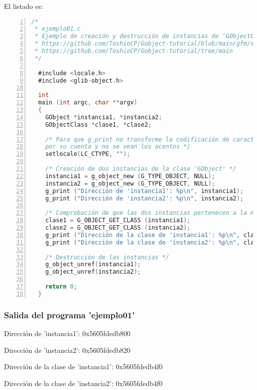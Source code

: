 El listado es:
\begin{lstlisting}[language=C, numbers=left]
/*
 * ejemplo01.c
 * Ejemplo de creación y destrucción de instancias de 'GObjectClass'.
 * https://github.com/ToshioCP/Gobject-tutorial/blob/main/gfm/sec2.md
 * https://github.com/ToshioCP/Gobject-tutorial/tree/main
 */

  #include <locale.h>
  #include <glib-object.h>

  int
  main (int argc, char **argv)
  {
    GObject *instancia1, *instancia2;
    GObjectClass *clase1, *clase2;

    /* Para que g_print no transforme la codificación de caracteres
    por su cuenta y no se vean los acentos */
    setlocale(LC_CTYPE, "");

    /* Creación de dos instancias de la clase 'GObject' */
    instancia1 = g_object_new (G_TYPE_OBJECT, NULL);
    instancia2 = g_object_new (G_TYPE_OBJECT, NULL);
    g_print ("Dirección de 'instancia1': %p\n", instancia1);
    g_print ("Dirección de 'instancia2': %p\n", instancia2);

    /* Comprobación de que las dos instancias pertenecen a la misma clase */
    clase1 = G_OBJECT_GET_CLASS (instancia1);
    clase2 = G_OBJECT_GET_CLASS (instancia2);
    g_print ("Dirección de la clase de 'instancia1': %p\n", clase1);
    g_print ("Dirección de la clase de 'instancia2': %p\n", clase2);

    /* Destrucción de las instancias */
    g_object_unref(instancia1);
    g_object_unref(instancia2);

    return 0;
  }
\end{lstlisting}

\subsubsection{Salida del programa 'ejemplo01'}
\textsf{Dirección de 'instancia1': 0x5605fdedb800}\par
\textsf{Dirección de 'instancia2': 0x5605fdedb820}\par
\textsf{Dirección de la clase de 'instancia1':  0x5605fdedb4f0}\par
\textsf{Dirección de la clase de 'instancia2':  0x5605fdedb4f0}\par


